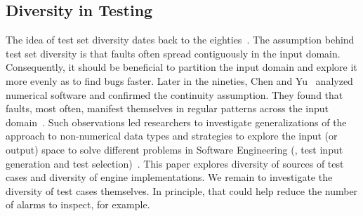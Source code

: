 \documentclass[smallextended]{svjour3}
\begin{document}
\subsection{\label{sec:related:diversity-testing}Diversity in Testing}
The idea of test set diversity dates back to the
eighties~\cite{white-cohen-tse1980,ostrand-balcer-1988}. The
assumption behind test set diversity is that faults often spread
contiguously in the input domain. Consequently, it should be
beneficial to partition the input domain and explore it more evenly as
to find bugs faster. Later in the nineties, Chen and
Yu~\cite{chen-yu-tse1996} analyzed numerical software and confirmed
the continuity assumption. They found that faults, most often,
manifest themselves in regular patterns across the input
domain~\cite{Chen:2010:ART:1663656.1663914,7515474}.  Such
observations led researchers to investigate generalizations of the
approach to non-numerical data types and strategies to explore the
input (or output) space to solve different problems in Software
Engineering (\eg{}, test input generation and test
selection)~\cite{mayer-ase2005,bueno-etal-ase2007,ciupa-etal-icse08,alshahwan-harman-icse2012,alshahwan-harman-issta2014,7515474}. This
paper explores diversity of sources of test cases and diversity of
engine implementations. We remain to investigate the diversity of test
cases themselves. In principle, that could help reduce the number of
alarms to inspect, for example.
\end{document}
